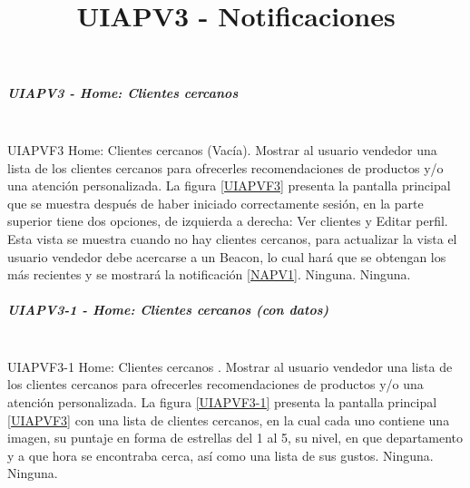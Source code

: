 \subparagraph{UIAPV3 - Home: Clientes cercanos} ~\\

{UIAPVF3} %
{Home: Clientes cercanos (Vacía).}  %
{Mostrar al usuario vendedor una lista de los clientes cercanos para ofrecerles recomendaciones de productos y/o una atención personalizada.} %
{La figura \ref{UIAPVF3} presenta la pantalla principal que se muestra después de haber iniciado correctamente sesión, en la parte superior tiene dos opciones, de izquierda a derecha: Ver clientes y Editar perfil. Esta vista se muestra cuando no hay clientes cercanos, para actualizar la vista el usuario vendedor debe acercarse a un Beacon, lo cual hará que se obtengan los más recientes y se mostrará la notificación \ref{NAPV1}.} %
{Ninguna.} %
{Ninguna.} %

\subparagraph{UIAPV3-1 - Home: Clientes cercanos (con datos)} ~\\

{UIAPVF3-1} %
{Home: Clientes cercanos .}  %
{Mostrar al usuario vendedor una lista de los clientes cercanos para ofrecerles recomendaciones de productos y/o una atención personalizada.} %
{La figura \ref{UIAPVF3-1} presenta la pantalla principal \ref{UIAPVF3} con una lista de clientes cercanos, en la cual cada uno contiene una imagen, su puntaje en forma de estrellas del 1 al 5, su nivel, en que departamento y a que hora se encontraba cerca, así como una lista de sus gustos.} %
{Ninguna.} %
{Ninguna.} %


\title{\textbf{UIAPV3 - Notificaciones}\\}
